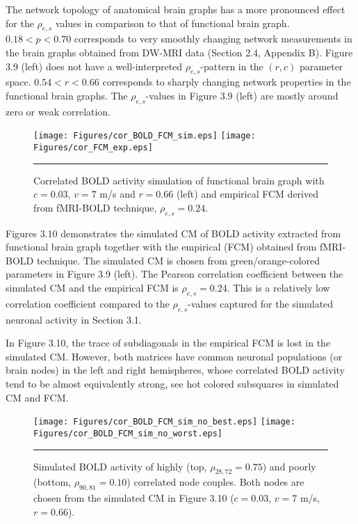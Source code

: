 The network topology of anatomical brain graphs has a more pronounced effect for the $\rho_{e,s}$ values in comparison to that of functional brain graph. $0.18<p<0.70$ corresponds to very smoothly changing network measurements in the brain graphs obtained from DW-MRI data (Section 2.4, Appendix B). Figure 3.9 (left) does not have a well-interpreted $\rho_{e,s}$-pattern in the $(r,c)$ parameter space. $0.54<r<0.66$ corresponds to sharply changing network properties in the functional brain graphs. The $\rho_{e,s}$-values in Figure 3.9 (left) are mostly around zero or weak correlation.



\begin{figure}[htbp]
 
  \centering
	 \texttt{[image: Figures/cor\_BOLD\_FCM\_sim.eps]} 
   	 \texttt{[image: Figures/cor\_FCM\_exp.eps]} 

    \rule{35em}{0.5pt}
  \caption[Well correlated BOLD simulation, FCM]{Correlated BOLD activity simulation of functional brain graph with $c=0.03$, $v=7$ m/s and $r=0.66$ (left) and empirical FCM derived from fMRI-BOLD technique, $\rho_{e,s} = 0.24$.} 
    \label{fig:High correlated BOLD simulation, FCM}
 	
\end{figure}  



Figures 3.10 demonstrates the simulated CM of BOLD activity extracted from functional brain graph together with the empirical (FCM) obtained from fMRI-BOLD technique. The simulated CM is chosen from green/orange-colored parameters in Figure 3.9 (left). The Pearson correlation coefficient between the simulated CM and the empirical FCM is $\rho_{e,s} = 0.24$. This is a relatively low correlation coefficient compared to the $\rho_{e,s}$-values captured for the simulated neuronal activity in Section 3.1.

In Figure 3.10, the trace of subdiagonals in the empirical FCM is lost in the simulated CM. However, both matrices have common neuronal populations (or brain nodes) in the left and right hemispheres, whose correlated BOLD activity tend to be almost equivalently strong, see hot colored subsquares in simulated CM and FCM.



\begin{figure}[htbp]
 
  \centering
	 \texttt{[image: Figures/cor\_BOLD\_FCM\_sim\_no\_best.eps]} 
   	 \texttt{[image: Figures/cor\_BOLD\_FCM\_sim\_no\_worst.eps]} 

    \rule{35em}{0.5pt}
  \caption[BOLD Activity Node Dynamics, FCM]{Simulated BOLD activity of highly (top, $\rho_{28,72}=0.75$) and poorly (bottom, $\rho_{90,81}=0.10$) correlated node couples. Both nodes are chosen from the simulated CM in Figure 3.10 ($c=0.03$, $v=7$ m/s, $r=0.66$).} 
    \label{fig:BOLD Activity Node Dynamics, FCM}
 	
\end{figure} 

